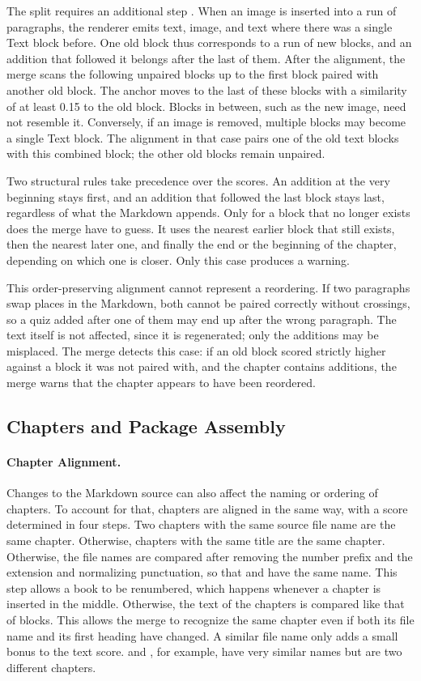 The split requires an additional step .
When an image is inserted into a run of paragraphs, the renderer emits text, image, and text where
there was a single Text block before.
One old block thus corresponds to a run of new blocks, and an addition that followed it
belongs after the last of them.
After the alignment, the merge scans the following unpaired blocks up to the first block paired
with another old block.
The anchor moves to the last of these blocks with a similarity of at least 0.15 to the old block.
Blocks in between, such as the new image, need not resemble it.
Conversely, if an image is removed, multiple blocks may become a single Text block.
The alignment in that case pairs one of the old text blocks with this combined block; the other old blocks
remain unpaired.

Two structural rules take precedence over the scores.
An addition at the very beginning stays first, and an addition that followed
the last block stays last, regardless of what the Markdown appends.
Only for a block that no longer exists does the merge have to guess.
It uses the nearest earlier block that still exists, then the nearest later one, and finally the end
or the beginning of the chapter, depending on which one is closer.
Only this case produces a warning.

This order-preserving alignment cannot represent a reordering.
If two paragraphs swap places in the Markdown, both cannot be paired correctly without crossings,
so a quiz added after one of them may end up after the wrong paragraph.
The text itself is not affected, since it is regenerated; only the additions may be misplaced.
The merge detects this case: if an old block scored strictly higher against a block it was not paired with, and the chapter
contains additions, the merge warns that the chapter appears to have been reordered.

\subsection{Chapters and Package Assembly}
\label{sec:mg_result}

\paragraph{Chapter Alignment.}
Changes to the Markdown source can also affect the naming or ordering of chapters.
To account for that, chapters are aligned in the same way, with a score determined in four steps.
Two chapters with the same source file name are the same chapter.
Otherwise, chapters with the same title are the same chapter.
Otherwise, the file names are compared after removing the number prefix and the extension and
normalizing punctuation, so that  and
 have the same name.
This step allows a book to be renumbered, which happens whenever a chapter is inserted in the middle.
Otherwise, the text of the chapters is compared like that of blocks.
This allows the merge to recognize the same chapter even if both its file name and its first heading
have changed.
A similar file name only adds a small bonus to the text score.
 and , for example, have very similar names but are two
different chapters.

